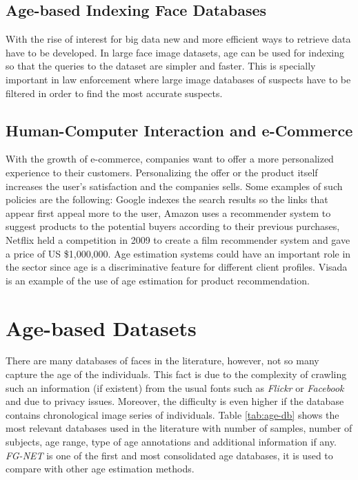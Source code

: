 \subsection{Age-based Indexing Face Databases}
With the rise of interest for big data new and more efficient ways to retrieve data have to be developed. In large face image datasets, age can be used for indexing so that the queries to the dataset are simpler and faster. This is specially important in law enforcement where large image databases of suspects have to be filtered in order to find the most accurate suspects.

\subsection{Human-Computer Interaction and e-Commerce}
With the growth of e-commerce, companies want to offer a more personalized experience to their customers. Personalizing the offer or the product itself increases the user's satisfaction and the companies sells. Some examples of such policies are the following: Google \cite{Brin:1998:ALH:297810.297827} indexes the search results so the links that appear first appeal more to the user, Amazon \cite{Linden:2003:ARI:642462.642471} uses a recommender system to suggest products to the potential buyers according to their previous purchases, Netflix \cite{Koren:2009:MFT:1608565.1608614} held a competition in 2009 to create a film recommender system and gave a price of US \$1,000,000. Age estimation systems could have an important role in the sector since age is a discriminative feature for different client profiles. Visada \cite{visada} is an example of the use of age estimation for product recommendation.


\section{Age-based Datasets} \label{sec:ageDB}
There are many databases of faces in the literature, however, not so many capture the age of the individuals. This fact is due to the complexity of crawling such an information (if existent) from the usual fonts such as \textit{Flickr} or \textit{Facebook} and due to privacy issues. Moreover, the difficulty is even higher if the database contains chronological image series of individuals. Table \ref{tab:age-db} shows the most relevant databases used in the literature with number of samples, number of subjects, age range, type of age annotations and additional information if any. \textit{FG-NET} \cite{993553} is one of the first and most consolidated age databases, it is used to compare with other age estimation methods.

